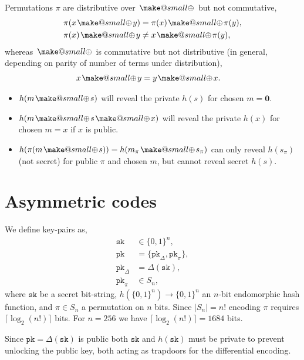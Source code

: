 \documentclass[twocolumn, aps, amsmath, amssymb, nofootinbib, superscriptaddress, longbibliography, doublefloatfix, table-of-contents, eqsecnum, rmp]{revtex4-2}
\makeatletter
\newcommand{\soplus}{{{\hspace{1pt}}{\mathbin{\mathpalette\make@small\oplus}}}{\hspace{1pt}}}
\newcommand{\make@small}[2]{%
  \vcenter{\hbox{%
    \scalebox{0.6}{$\m@th#1#2$}%
  }}%
}
\makeatother
\begin{document}
Permutations $\pi$ are distributive over $\soplus$ but not commutative,
\begin{align}
	\pi(x\soplus y) &= \pi(x) \soplus \pi(y),\nonumber\\
	\pi(x) \soplus y &\neq x \soplus \pi(y),
\end{align}
whereas $\soplus$ is commutative but not distributive (in general, depending on parity of number of terms under distribution),
\begin{align}
	x\soplus y &= y \soplus x.
\end{align}

\begin{itemize}
	\item $h(m\soplus s)$ will reveal the private $h(s)$ for chosen $m=\mathbf{0}$.
	\item $h(m\soplus s \soplus x)$ will reveal the private $h(x)$ for chosen $m=x$ if $x$ is public.
	\item $h(\pi(m\soplus s)) = h(m_\pi \soplus s_\pi)$ can only reveal $h(s_\pi)$ (not secret) for public $\pi$ and chosen $m$, but cannot reveal secret $h(s)$.
\end{itemize}

\section{Asymmetric codes}

We define key-pairs as,
\begin{align}
	\mathtt{sk} &\in \{0,1\}^n, \nonumber\\
	\mathtt{pk} &= \{\mathtt{pk}_\Delta,\mathtt{pk}_\pi\},\nonumber\\
	\mathtt{pk}_\Delta &= \Delta(\mathtt{sk}),\nonumber\\
	\mathtt{pk}_\pi &\in S_n,
\end{align}
where $\mathtt{sk}$ be a secret bit-string, $h(\{0,1\}^n)\to\{0,1\}^n$ an $n$-bit endomorphic hash function, and $\pi\in S_n$ a permutation on $n$ bits. Since $|S_n|=n!$ encoding $\pi$ requires $\lceil\log_2(n!)\rceil$ bits. For $n=256$ we have $\lceil\log_2(n!)\rceil = 1684$ bits.

Since $\mathtt{pk} = \Delta(\mathtt{sk})$ is public both $\mathtt{sk}$ and $h(\mathtt{sk})$ must be private to prevent unlocking the public key, both acting as trapdoors for the differential encoding.
\end{document}
